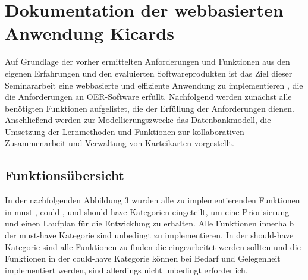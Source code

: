 \section{Dokumentation der webbasierten Anwendung Kicards}
Auf Grundlage der vorher ermittelten Anforderungen und Funktionen aus den eigenen Erfahrungen und den evaluierten Softwareprodukten ist das Ziel dieser Seminararbeit eine webbasierte und effiziente Anwendung zu implementieren \cite{kicards}, die die Anforderungen an OER-Software erfüllt. Nachfolgend werden zunächst alle benötigten Funktionen aufgelistet, die der Erfüllung der Anforderungen dienen. Anschließend werden zur Modellierungszwecke das Datenbankmodell, die Umsetzung der Lernmethoden und Funktionen zur kollaborativen Zusammenarbeit und Verwaltung von Karteikarten vorgestellt.


\subsection{Funktionsübersicht}
In der nachfolgenden Abbildung 3 wurden alle zu implementierenden Funktionen in must-, could-, und should-have Kategorien eingeteilt, um eine Priorisierung und einen Laufplan für die Entwicklung zu erhalten. Alle Funktionen innerhalb der must-have Kategorie sind unbedingt zu implementieren. In der should-have Kategorie sind alle Funktionen zu finden die eingearbeitet werden sollten und die Funktionen in der could-have Kategorie können bei Bedarf und Gelegenheit implementiert werden, sind allerdings nicht unbedingt erforderlich. \\

